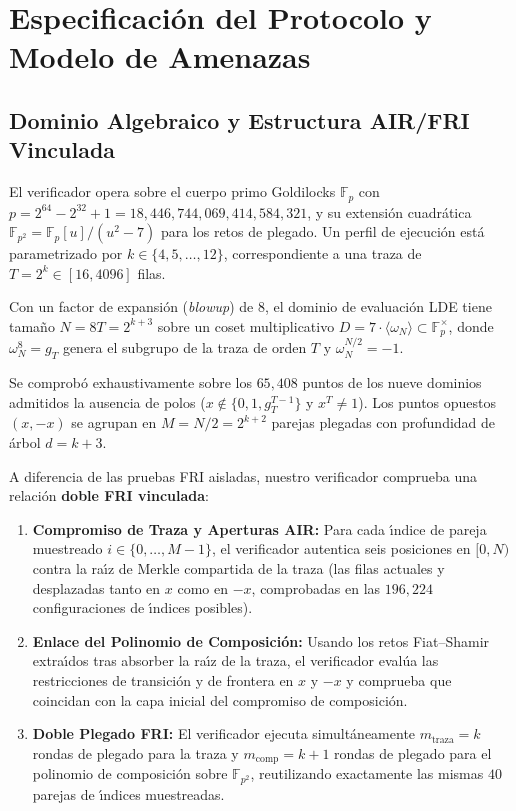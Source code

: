 \documentclass[conference]{IEEEtran}
\theoremstyle{definition}
\begin{document}
\section{Especificaci\'{o}n del Protocolo y Modelo de Amenazas}
\label{sec:protocol}

\subsection{Dominio Algebraico y Estructura AIR/FRI Vinculada}
El verificador opera sobre el cuerpo primo Goldilocks $\mathbb{F}_p$ con $p = 2^{64} - 2^{32} + 1 = 18{,}446{,}744{,}069{,}414{,}584{,}321$, y su extensi\'{o}n cuadr\'{a}tica $\mathbb{F}_{p^2} = \mathbb{F}_p[u]/(u^2 - 7)$ para los retos de plegado. Un perfil de ejecuci\'{o}n est\'{a} parametrizado por $k \in \{4, 5, \dots, 12\}$, correspondiente a una traza de $T = 2^k \in [16, 4096]$ filas.

Con un factor de expansi\'{o}n (\emph{blowup}) de $8$, el dominio de evaluaci\'{o}n LDE tiene tama\~{n}o $N = 8T = 2^{k+3}$ sobre un coset multiplicativo $D = 7 \cdot \langle \omega_N \rangle \subset \mathbb{F}_p^\times$, donde $\omega_N^8 = g_T$ genera el subgrupo de la traza de orden $T$ y $\omega_N^{N/2} = -1$.

Se comprob\'{o} exhaustivamente sobre los $65{,}408$ puntos de los nueve dominios admitidos la ausencia de polos ($x \notin \{0, 1, g_T^{T-1}\}$ y $x^T \neq 1$). Los puntos opuestos $(x, -x)$ se agrupan en $M = N / 2 = 2^{k+2}$ parejas plegadas con profundidad de \'{a}rbol $d = k + 3$.

A diferencia de las pruebas FRI aisladas, nuestro verificador comprueba una relaci\'{o}n \textbf{doble FRI vinculada}:
\begin{enumerate}
    \setlength{\itemsep}{2pt}
    \item \textbf{Compromiso de Traza y Aperturas AIR:} Para cada \'{\i}ndice de pareja muestreado $i \in \{0, \dots, M-1\}$, el verificador autentica seis posiciones en $[0, N)$ contra la ra\'{\i}z de Merkle compartida de la traza (las filas actuales y desplazadas tanto en $x$ como en $-x$, comprobadas en las $196{,}224$ configuraciones de \'{\i}ndices posibles).
    \item \textbf{Enlace del Polinomio de Composici\'{o}n:} Usando los retos Fiat--Shamir extra\'{\i}dos tras absorber la ra\'{\i}z de la traza, el verificador eval\'{u}a las restricciones de transici\'{o}n y de frontera en $x$ y $-x$ y comprueba que coincidan con la capa inicial del compromiso de composici\'{o}n.
    \item \textbf{Doble Plegado FRI:} El verificador ejecuta simult\'{a}neamente $m_{\text{traza}} = k$ rondas de plegado para la traza y $m_{\text{comp}} = k + 1$ rondas de plegado para el polinomio de composici\'{o}n sobre $\mathbb{F}_{p^2}$, reutilizando exactamente las mismas $40$ parejas de \'{\i}ndices muestreadas.
\end{enumerate}
\end{document}
